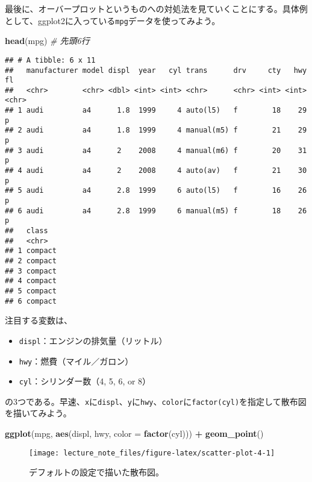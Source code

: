 \documentclass[]{book}
\newenvironment{Shaded}{\begin{snugshade}}{\end{snugshade}}
\newcommand{\KeywordTok}[1]{\textcolor[rgb]{0.13,0.29,0.53}{\textbf{#1}}}
\newcommand{\DataTypeTok}[1]{\textcolor[rgb]{0.13,0.29,0.53}{#1}}
\newcommand{\StringTok}[1]{\textcolor[rgb]{0.31,0.60,0.02}{#1}}
\newcommand{\CommentTok}[1]{\textcolor[rgb]{0.56,0.35,0.01}{\textit{#1}}}
\newcommand{\OperatorTok}[1]{\textcolor[rgb]{0.81,0.36,0.00}{\textbf{#1}}}
\newcommand{\NormalTok}[1]{#1}
\begin{document}
最後に、オーバープロットというものへの対処法を見ていくことにする。具体例として、ggplot2に入っている\texttt{mpg}データを使ってみよう。

\begin{Shaded}
\begin{Highlighting}[]
\KeywordTok{head}\NormalTok{(mpg) }\CommentTok{# 先頭6行}
\end{Highlighting}
\end{Shaded}

\begin{verbatim}
## # A tibble: 6 x 11
##   manufacturer model displ  year   cyl trans      drv     cty   hwy fl   
##   <chr>        <chr> <dbl> <int> <int> <chr>      <chr> <int> <int> <chr>
## 1 audi         a4      1.8  1999     4 auto(l5)   f        18    29 p    
## 2 audi         a4      1.8  1999     4 manual(m5) f        21    29 p    
## 3 audi         a4      2    2008     4 manual(m6) f        20    31 p    
## 4 audi         a4      2    2008     4 auto(av)   f        21    30 p    
## 5 audi         a4      2.8  1999     6 auto(l5)   f        16    26 p    
## 6 audi         a4      2.8  1999     6 manual(m5) f        18    26 p    
##   class  
##   <chr>  
## 1 compact
## 2 compact
## 3 compact
## 4 compact
## 5 compact
## 6 compact
\end{verbatim}

注目する変数は、

\begin{itemize}
\item
  \texttt{displ}：エンジンの排気量（リットル）
\item
  \texttt{hwy}：燃費（マイル／ガロン）
\item
  \texttt{cyl}：シリンダー数（4, 5, 6, or 8）
\end{itemize}

の3つである。早速、\texttt{x}に\texttt{displ}、\texttt{y}に\texttt{hwy}、\texttt{color}に\texttt{factor(cyl)}を指定して散布図を描いてみよう。



\begin{Shaded}
\begin{Highlighting}[]
\KeywordTok{ggplot}\NormalTok{(mpg, }\KeywordTok{aes}\NormalTok{(displ, hwy, }\DataTypeTok{color =} \KeywordTok{factor}\NormalTok{(cyl))) }\OperatorTok{+}
\StringTok{  }\KeywordTok{geom_point}\NormalTok{()}
\end{Highlighting}
\end{Shaded}

\begin{figure}

{\centering \texttt{[image: lecture\_note\_files/figure-latex/scatter-plot-4-1]} 

}

\caption{デフォルトの設定で描いた散布図。}\label{fig:scatter-plot-4}
\end{figure}
\end{document}
